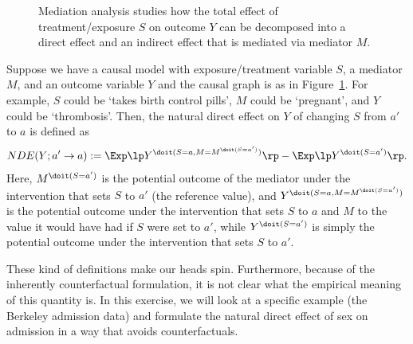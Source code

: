 \begin{figure}[!h]\centering
{}
\caption{\label{fig:mediation_analysis}Mediation analysis studies how the total effect
  of treatment/exposure $S$ on outcome $Y$ can be decomposed into a direct effect and 
  an indirect effect that is mediated via mediator $M$.}
\end{figure}

Suppose we have a causal model with exposure/treatment variable $S$, a mediator $M$, and an outcome variable $Y$ and the causal graph is as in Figure~\ref{fig:mediation_analysis}.
For example, $S$ could be `takes birth control pills', $M$ could be `pregnant', and $Y$ could be `thrombosis'.
Then, the natural direct effect on $Y$ of changing $S$ from $a'$ to $a$ is defined as
\begin{equation}\label{eq:nde_counterfactual}
NDE(Y; a' \to a) := \Exp \lp Y^{\doit(S=a,M=M^{\doit(S=a')})} \rp - \Exp \lp Y^{\doit(S=a')} \rp.
\end{equation}
Here, $M^{\doit(S=a')}$ is the potential outcome of the mediator under the intervention that sets $S$ to $a'$ (the reference value), and $Y^{\doit(S=a,M=M^{\doit(S=a')})}$ is the potential outcome under the intervention that sets $S$ to $a$ and $M$ to the value it would have had if $S$ were set to $a'$, while $Y^{\doit(S=a')}$ is simply the potential outcome under the intervention that sets $S$ to $a'$.

These kind of definitions make our heads spin. 
Furthermore, because of the inherently counterfactual formulation, it is not clear what the empirical meaning of this quantity is.
In this exercise, we will look at a specific example (the Berkeley admission data) and formulate the natural direct effect of sex on admission in a way that avoids counterfactuals.

